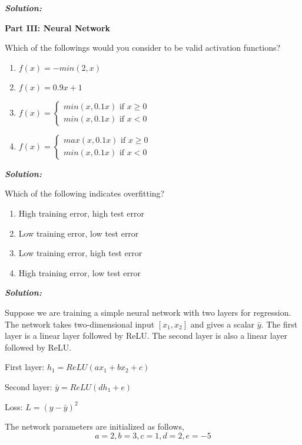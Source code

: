 \documentclass[addpoints,12pt]{exam}
\begin{document}
\begin{questions}
\textbf{\textit{{\color{coral} Solution:}}}

\hspace{-0.25in}\noindent\textbf{{\large Part III: Neural Network}}

\question Which of the followings would you consider to be valid activation functions?

\begin{enumerate}[label=(\alph*)]
\item $f(x)=-min(2,x)$
\item $f(x)=0.9x+1$
\item $f(x)=\begin{cases}min(x,0.1x)\text{ if }x\geq 0 \\  min(x,0.1x)\text{ if }x <  0\end{cases}$
\item $f(x)=\begin{cases}max(x,0.1x)\text{ if }x\geq 0 \\  min(x,0.1x)\text{ if }x <  0\end{cases}$
\end{enumerate}

\textbf{\textit{{\color{coral} Solution:}}}

\question Which of the following indicates overfitting? 
\begin{enumerate}[label=(\alph*)]
    \item High training error, high test error
    \item Low training error, low test error
    \item Low training error, high test error
    \item High training error, low test error
\end{enumerate}

\textbf{\textit{{\color{coral} Solution:}}}

\question 	Suppose we are training a simple neural network with two layers for regression. The network takes two-dimensional input $[x_1,x_2]$ and gives a scalar $\bar{y}$. The first layer is a linear layer followed by ReLU. The second layer is also a linear layer followed by ReLU.


First layer: $h_1=ReLU(ax_1+bx_2+c)$

Second layer: $\bar{y}=ReLU(dh_1+e)$

Loss: $L=(y-\bar{y} )^2$

The network parameters are initialized as follows,
\begin{equation}
    a=2, b=3, c=1, d=2, e=-5
\end{equation}


\end{questions}
\end{document}
